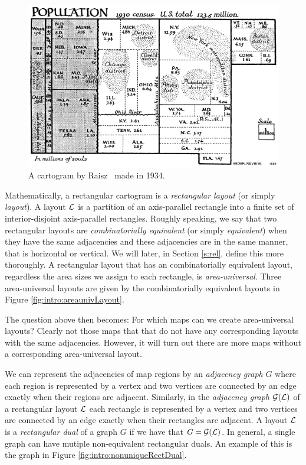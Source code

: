   \begin{figure}[!b]
    \centering
    \includegraphics[scale=.7]{introduction/img/cartogram.png}
    \caption{A cartogram by Raisz~\cite{Raisz1934} made in 1934.}
    \label{fig:intro:raisz}
  \end{figure}
  
  Mathematically, a rectangular cartogram is a  \emph{rectangular layout} (or simply \emph{layout}).
  A layout $\mathcal{L}$ is a partition of an axis-parallel rectangle into a finite set of interior-disjoint axis-parallel rectangles.
  Roughly speaking, we say that two rectangular layouts are \emph{combinatorially equivalent} (or simply \emph{equivalent}) when they have the same adjacencies and these adjacencies are in the same manner, that is horizontal or vertical. We will later, in Section \ref{s:rel}, define this more thoroughly.
  A rectangular layout that has an combinatorially equivalent layout, regardless the area sizes we assign to each rectangle, is \emph{area-universal}. Three area-universal layouts are given by the  combinatorially equivalent layouts in Figure \ref{fig:intro:areaunivLayout}.

  The question above then becomes: For which maps can we create area-universal layouts?
  Clearly not those maps that that do not have any corresponding layouts with the same adjacencies. However, it will turn out there are more maps without a corresponding area-universal layout.

  We can represent the adjacencies of map regions by an \emph{adjacency graph} $G$ where each region is represented by a vertex and two vertices are connected by an edge exactly when their regions are adjacent.
  Similarly, in the \emph{adjacency graph} $\mathcal{G}(\mathcal{L})$ of a rectangular layout $\mathcal{L}$ each rectangle is represented by a vertex and two vertices are connected by an edge exactly when their rectangles are adjacent.
  A layout $\mathcal{L}$ is a \emph{rectangular dual} of a graph $G$ if we have that $G = \mathcal{G}(\mathcal{L})$.
  In general, a single graph can have mutiple non-equivalent rectangular duals. An example of this is the graph in Figure \ref{fig:intro:nonuniqueRectDual}.

